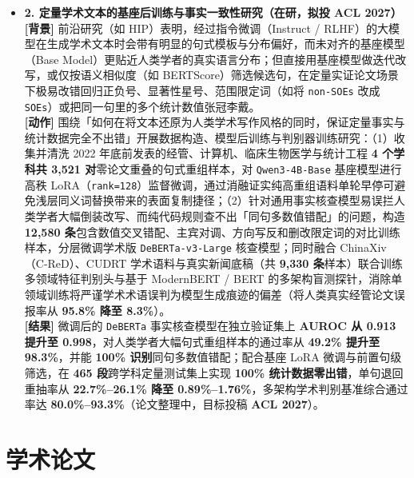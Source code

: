 \documentclass[10pt,letterpaper]{article}
\begin{document}
\begin{itemize}[leftmargin=0pt,label={}]
\begin{itemize}[leftmargin=10pt,label=$\circ$,itemsep=2.5pt,topsep=1.5pt]
    \item \textbf{2. 定量学术文本的基座后训练与事实一致性研究（在研，拟投 ACL 2027）} \\
    \textbf{[背景]} 前沿研究（如 HIP）表明，经过指令微调（Instruct / RLHF）的大模型在生成学术文本时会带有明显的句式模板与分布偏好，而未对齐的基座模型（Base Model）更贴近人类学者的真实语言分布；但直接用基座模型做迭代改写，或仅按语义相似度（如 BERTScore）筛选候选句，在定量实证论文场景下极易改错回归正负号、显著性星号、范围限定词（如将 \texttt{non-SOEs} 改成 \texttt{SOEs}）或把同一句里的多个统计数值张冠李戴。 \\
    \textbf{[动作]} 围绕「如何在将文本还原为人类学术写作风格的同时，保证定量事实与统计数据完全不出错」开展数据构造、模型后训练与判别器训练研究：（1）收集并清洗 2022 年底前发表的经管、计算机、临床生物医学与统计工程 \textbf{4 个学科共 3,521 对}零论文重叠的句式重组样本，对 \texttt{Qwen3-4B-Base} 基座模型进行高秩 LoRA（\texttt{rank=128}）监督微调，通过消融证实纯高重组语料单轮早停可避免浅层同义词替换带来的表面复制捷径；（2）针对通用事实核查模型易误拦人类学者大幅倒装改写、而纯代码规则查不出「同句多数值错配」的问题，构造 \textbf{12,580 条}包含数值交叉错配、主宾对调、方向写反和删改限定词的对比训练样本，分层微调学术版 \texttt{DeBERTa-v3-Large} 核查模型；同时融合 ChinaXiv（C-ReD）、CUDRT 学术语料与真实新闻底稿（共 \textbf{9,330 条}样本）联合训练多领域特征判别头与基于 ModernBERT / BERT 的多架构盲测探针，消除单领域训练将严谨学术术语误判为模型生成痕迹的偏差（将人类真实经管论文误报率从 \textbf{95.8\% 降至 8.3\%}）。 \\
    \textbf{[结果]} 微调后的 \texttt{DeBERTa} 事实核查模型在独立验证集上 \textbf{AUROC 从 0.913 提升至 0.998}，对人类学者大幅句式重组样本的通过率从 \textbf{49.2\% 提升至 98.3\%}，并能 \textbf{100\% 识别}同句多数值错配；配合基座 LoRA 微调与前置句级筛选，在 \textbf{465 段}跨学科定量测试集上实现 \textbf{100\% 统计数据零出错}，单句退回重抽率从 \textbf{22.7\%--26.1\% 降至 0.89\%--1.76\%}，多架构学术判别基准综合通过率达 \textbf{80.0\%--93.3\%}（论文整理中，目标投稿 \textbf{ACL 2027}）。
  \end{itemize}
\end{itemize}

\section{学术论文}
\end{document}
